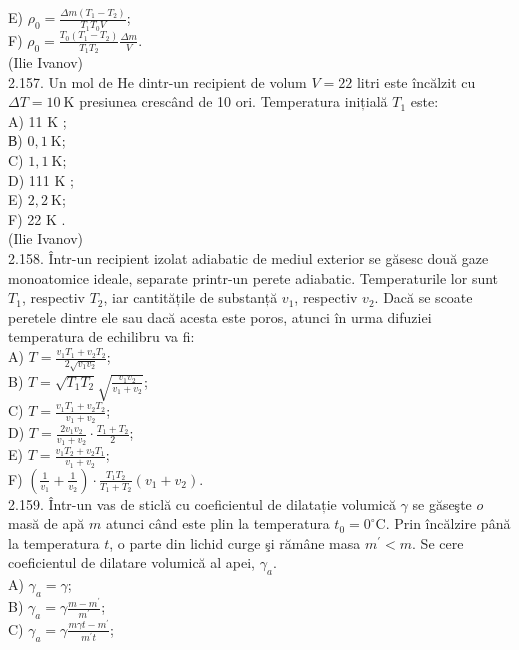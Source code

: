 \documentclass[10pt]{article}
\begin{document}
E) $\rho_{0}=\frac{\Delta m\left(T_{1}-T_{2}\right)}{T_{1} T_{0} V}$;\\
F) $\rho_{0}=\frac{T_{0}\left(T_{1}-T_{2}\right)}{T_{1} T_{2}} \frac{\Delta m}{V}$.\\
(Ilie Ivanov)\\
2.157. Un mol de He dintr-un recipient de volum $V=22$ litri este încălzit cu $\Delta T=10 \mathrm{~K}$ presiunea crescând de 10 ori. Temperatura inițială $T_{1}$ este:\\
A) 11 K ;\\
В) $0,1 \mathrm{~K}$;\\
C) $1,1 \mathrm{~K}$;\\
D) 111 K ;\\
E) $2,2 \mathrm{~K}$;\\
F) 22 K .\\
(Ilie Ivanov)\\
2.158. Într-un recipient izolat adiabatic de mediul exterior se găsesc două gaze monoatomice ideale, separate printr-un perete adiabatic. Temperaturile lor sunt $T_{1}$, respectiv $T_{2}$, iar cantitățile de substanță $v_{1}$, respectiv $v_{2}$. Dacă se scoate peretele dintre ele sau dacă acesta este poros, atunci în urma difuziei temperatura de echilibru va fi:\\
A) $T=\frac{v_{1} T_{1}+v_{2} T_{2}}{2 \sqrt{v_{1} v_{2}}}$;\\
B) $T=\sqrt{T_{1} T_{2}} \sqrt{\frac{v_{1} v_{2}}{v_{1}+v_{2}}}$;\\
C) $T=\frac{v_{1} T_{1}+v_{2} T_{2}}{v_{1}+v_{2}}$;\\
D) $T=\frac{2 v_{1} v_{2}}{v_{1}+v_{2}} \cdot \frac{T_{1}+T_{2}}{2}$;\\
E) $T=\frac{v_{1} T_{2}+v_{2} T_{1}}{v_{1}+v_{2}}$;\\
F) $\left(\frac{1}{v_{1}}+\frac{1}{v_{2}}\right) \cdot \frac{T_{1} T_{2}}{T_{1}+T_{2}}\left(v_{1}+v_{2}\right)$.\\
2.159. Într-un vas de sticlă cu coeficientul de dilatație volumică $\gamma$ se găseşte $o$ masă de apă $m$ atunci când este plin la temperatura $t_{0}=0^{\circ} \mathrm{C}$. Prin încălzire până la temperatura $t$, o parte din lichid curge şi rămâne masa $m^{\prime}<m$. Se cere coeficientul de dilatare volumică al apei, $\gamma_{a}$.\\
A) $\gamma_{a}=\gamma$;\\
B) $\gamma_{a}=\gamma \frac{m-m^{\prime}}{m^{\prime}}$;\\
C) $\gamma_{a}=\gamma \frac{m \gamma t-m^{\prime}}{m^{\prime} t}$;\\
\end{document}
